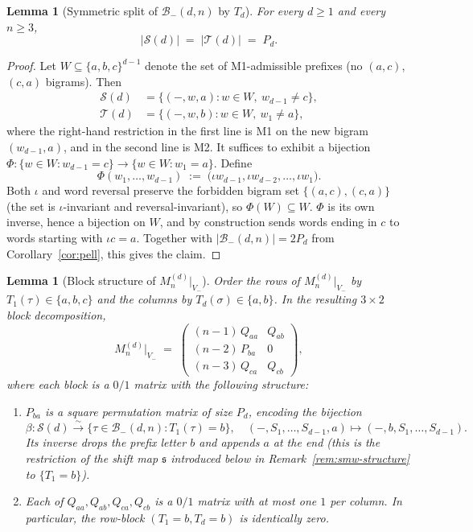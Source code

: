 \documentclass{amsart}
\newtheorem{lemma}[theorem]{Lemma}
\theoremstyle{definition}
\theoremstyle{remark}
\begin{document}
\begin{lemma}[Symmetric split of $\mathcal{B}_-(d, n)$ by $T_d$]
\label{lem:Vab-split}
For every $d \ge 1$ and every $n \ge 3$,
\[
  |\mathcal{S}(d)| \;=\; |\mathcal{T}(d)| \;=\; P_d.
\]
\end{lemma}

\begin{proof}
Let $W \subseteq \{a, b, c\}^{d-1}$ denote the set of
M1-admissible prefixes (no $(a, c)$, $(c, a)$ bigrams).  Then
\begin{align*}
  \mathcal{S}(d) &= \{(-, w, a) : w \in W,\ w_{d-1} \neq c\},\\
  \mathcal{T}(d) &= \{(-, w, b) : w \in W,\ w_1 \neq a\},
\end{align*}
where the right-hand restriction in the first line is M1 on
the new bigram $(w_{d-1}, a)$, and in the second line is M2.
It suffices to exhibit a bijection
$\Phi : \{w \in W : w_{d-1} = c\} \to \{w \in W : w_1 = a\}$.
Define
\[
  \Phi(w_1, \ldots, w_{d-1})
  \;:=\; \bigl(\iota w_{d-1}, \iota w_{d-2}, \ldots, \iota w_1\bigr).
\]
Both $\iota$ and word reversal preserve the forbidden bigram set
$\{(a, c), (c, a)\}$ (the set is $\iota$-invariant and
reversal-invariant), so $\Phi(W) \subseteq W$.  $\Phi$ is its
own inverse, hence a bijection on $W$, and by construction
sends words ending in $c$ to words starting with $\iota c = a$.
Together with $|\mathcal{B}_-(d, n)| = 2 P_d$ from
Corollary~\ref{cor:pell}, this gives the claim.
\end{proof}

\begin{lemma}[Block structure of $M_n^{(d)}|_{V_-}$]
\label{lem:Mmm-block}
Order the rows of $M_n^{(d)}|_{V_-}$ by $T_1(\tau) \in \{a, b, c\}$
and the columns by $T_d(\sigma) \in \{a, b\}$.  In the resulting
$3 \times 2$ block decomposition,
\begin{equation}\label{eq:Mmm-block}
  M_n^{(d)}\big|_{V_-}
  \;=\;
  \begin{pmatrix}
    (n-1)\, Q_{aa} & Q_{ab} \\
    (n-2)\, P_{ba} & 0 \\
    (n-3)\, Q_{ca} & Q_{cb}
  \end{pmatrix},
\end{equation}
where each block is a $0/1$ matrix with the following structure:
\begin{enumerate}
\item[\textup{(i)}] $P_{ba}$ is a \emph{square permutation matrix
of size $P_d$}, encoding the bijection
\[
  \beta : \mathcal{S}(d) \xrightarrow{\;\sim\;}
          \{\tau \in \mathcal{B}_-(d, n) : T_1(\tau) = b\},
  \quad
  (-, S_1, \ldots, S_{d-1}, a) \mapsto (-, b, S_1, \ldots, S_{d-1}).
\]
Its inverse drops the prefix letter $b$ and appends $a$ at the end
\textup{(}this is the restriction of the shift map $\mathfrak{s}$
introduced below in Remark~\ref{rem:smw-structure} to
$\{T_1 = b\}$\textup{)}.
\item[\textup{(ii)}] Each of $Q_{aa}, Q_{ab}, Q_{ca}, Q_{cb}$ is a
$0/1$ matrix with at most one $1$ per column.  In particular,
the row-block $(T_1 = b, T_d = b)$ is identically zero.
\end{enumerate}
\end{lemma}
\end{document}
